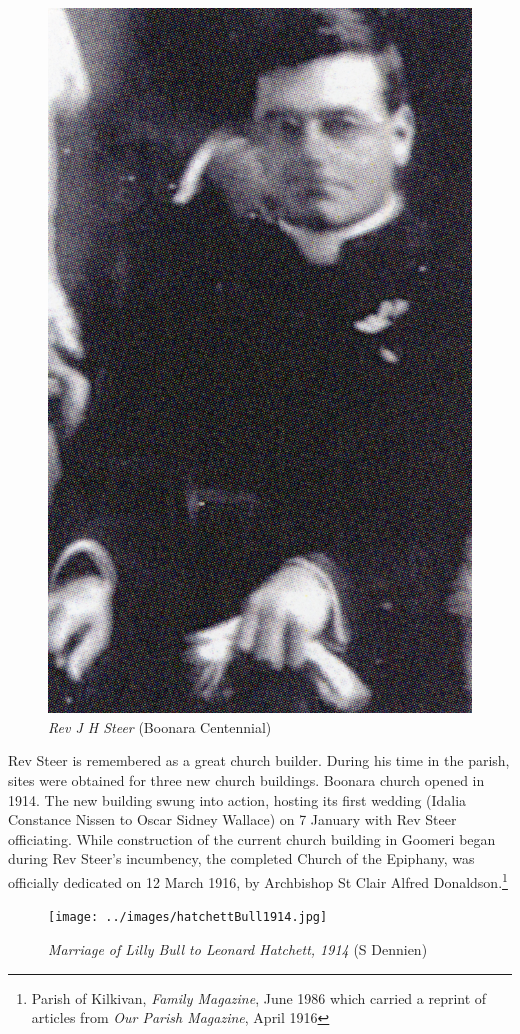 \begin{figure}
\begin{center}
\includegraphics[width=.6\linewidth,center]{../images/JHSteer.jpg}
\caption{{\itshape Rev J H Steer} {\scriptsize(Boonara Centennial)}}
\end{center}
\end{figure}




Rev Steer is remembered as a great church builder. During his time in the parish, sites were obtained for three new church buildings. Boonara church opened in 1914. The new building swung into action, hosting its first wedding (Idalia Constance Nissen to Oscar Sidney Wallace) on 7 January with Rev Steer officiating. While construction of the current church building in Goomeri began during Rev Steer's incumbency, the completed Church of the Epiphany, was officially dedicated on 12 March 1916, by Archbishop St Clair Alfred Donaldson.\footnote{Parish of Kilkivan, \emph{Family Magazine}, June 1986 which carried a reprint of articles from \emph{Our Parish Magazine}, April 1916}








\begin{figure}[!htb]
\begin{center}
\texttt{[image: ../images/hatchettBull1914.jpg]}
\caption{{\itshape Marriage of Lilly Bull to Leonard Hatchett, 1914} {\scriptsize(S Dennien)}}
\end{center}
\end{figure}




